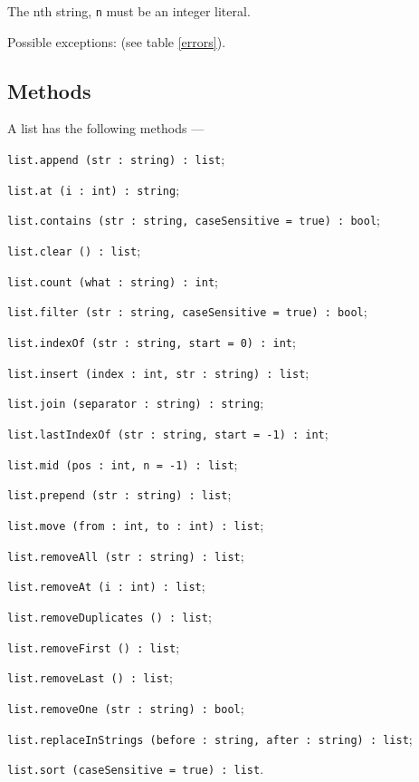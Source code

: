 The nth string, \texttt{n} must be an integer literal.

Possible exceptions:  (see table \ref{errors}).

\subsection{Methods}

A list has the following methods —
\begin{icItems}
\item \texttt{list.append (str : string) : list};
\item \texttt{list.at (i : int) : string};
\item \texttt{list.contains (str : string, caseSensitive = true) : bool};
\item \texttt{list.clear () : list};
\item \texttt{list.count (what : string) : int};
\item \texttt{list.filter (str : string, caseSensitive = true) : bool};
\item \texttt{list.indexOf (str : string, start = 0) : int};
\item \texttt{list.insert (index : int, str : string) : list};
\item \texttt{list.join (separator : string) : string};
\item \texttt{list.lastIndexOf (str : string, start = -1) : int};
\item \texttt{list.mid (pos : int, n = -1) : list};
\item \texttt{list.prepend (str : string) : list};
\item \texttt{list.move (from : int, to : int) : list};
\item \texttt{list.removeAll (str : string) : list};
\item \texttt{list.removeAt (i : int) : list};
\item \texttt{list.removeDuplicates () : list};
\item \texttt{list.removeFirst () : list};
\item \texttt{list.removeLast () : list};
\item \texttt{list.removeOne (str : string) : bool};
\item \texttt{list.replaceInStrings (before : string, after : string) : list};
\item \texttt{list.sort (caseSensitive = true) : list}.
\end{icItems}

